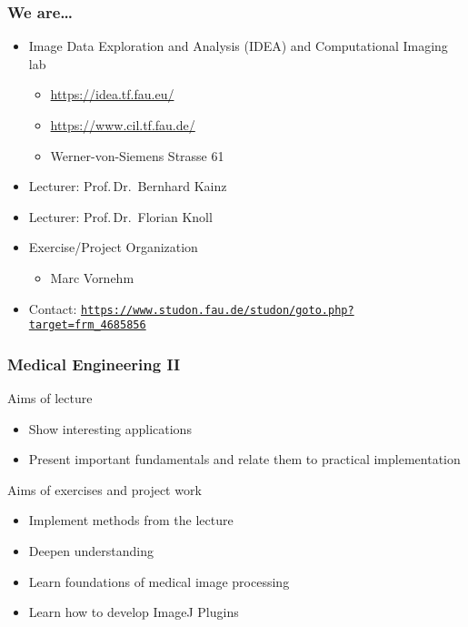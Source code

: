 

\subtitle{Motivation}




\nocite{*}

\frame[plain,c]{\titlepage} %

\begin{frame}
	\frametitle{We are\ldots}
	\begin{itemize}
		\setlength\itemsep{0.5cm}
		\item Image Data Exploration and Analysis (IDEA) and Computational Imaging lab
		      \begin{itemize}
			      \item \url{https://idea.tf.fau.eu/}
			      \item \url{https://www.cil.tf.fau.de/}
			      \item Werner-von-Siemens Strasse 61
		      \end{itemize}
		\item Lecturer: Prof.\,Dr.\ Bernhard Kainz
		\item Lecturer: Prof.\,Dr.\ Florian Knoll
		\item Exercise/Project Organization
		      \begin{itemize}
			      \item Marc Vornehm
		      \end{itemize}
		\item Contact: \texttt{\url{https://www.studon.fau.de/studon/goto.php?target=frm_4685856}}
	\end{itemize}
\end{frame}

\begin{frame}
	\frametitle{Medical Engineering II}
	\begin{block}{Aims of lecture}
		\begin{itemize}
			\item Show interesting applications
			\item Present important fundamentals and relate them to practical
			      implementation
		\end{itemize}
	\end{block}
	\begin{block}{Aims of exercises and project work}
		\begin{itemize}
			\item Implement methods from the lecture
			\item Deepen understanding
			\item Learn foundations of medical image processing
			\item Learn how to develop ImageJ Plugins
		\end{itemize}
	\end{block}
\end{frame}


